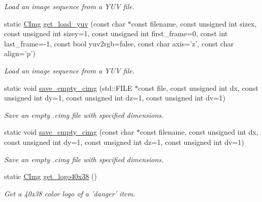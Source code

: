\begin{DoxyCompactItemize}
\begin{DoxyCompactList}\small\item\em Load an image sequence from a Y\-U\-V file. \end{DoxyCompactList}\item 
\hypertarget{structcimg__library_1_1_c_img_a2daa692c3f7bfdcc624d8c43d5416733}{static \hyperlink{structcimg__library_1_1_c_img}{C\-Img} \hyperlink{structcimg__library_1_1_c_img_a2daa692c3f7bfdcc624d8c43d5416733}{get\-\_\-load\-\_\-yuv} (const char $\ast$const filename, const unsigned int sizex, const unsigned int sizey=1, const unsigned int first\-\_\-frame=0, const int last\-\_\-frame=-\/1, const bool yuv2rgb=false, const char axis='z', const char align='p')}\label{structcimg__library_1_1_c_img_a2daa692c3f7bfdcc624d8c43d5416733}

\begin{DoxyCompactList}\small\item\em Load an image sequence from a Y\-U\-V file. \end{DoxyCompactList}\item 
\hypertarget{structcimg__library_1_1_c_img_aaf931adc345724053e6a7e3bb629c4eb}{static void \hyperlink{structcimg__library_1_1_c_img_aaf931adc345724053e6a7e3bb629c4eb}{save\-\_\-empty\-\_\-cimg} (std\-::\-F\-I\-L\-E $\ast$const file, const unsigned int dx, const unsigned int dy=1, const unsigned int dz=1, const unsigned int dv=1)}\label{structcimg__library_1_1_c_img_aaf931adc345724053e6a7e3bb629c4eb}

\begin{DoxyCompactList}\small\item\em Save an empty .cimg file with specified dimensions. \end{DoxyCompactList}\item 
\hypertarget{structcimg__library_1_1_c_img_aed95c69a895eb816a56d769e7f97080b}{static void \hyperlink{structcimg__library_1_1_c_img_aed95c69a895eb816a56d769e7f97080b}{save\-\_\-empty\-\_\-cimg} (const char $\ast$const filename, const unsigned int dx, const unsigned int dy=1, const unsigned int dz=1, const unsigned int dv=1)}\label{structcimg__library_1_1_c_img_aed95c69a895eb816a56d769e7f97080b}

\begin{DoxyCompactList}\small\item\em Save an empty .cimg file with specified dimensions. \end{DoxyCompactList}\item 
\hypertarget{structcimg__library_1_1_c_img_a04d6bb2563befb71032a6ea2c53ec494}{static \hyperlink{structcimg__library_1_1_c_img}{C\-Img} \hyperlink{structcimg__library_1_1_c_img_a04d6bb2563befb71032a6ea2c53ec494}{get\-\_\-logo40x38} ()}\label{structcimg__library_1_1_c_img_a04d6bb2563befb71032a6ea2c53ec494}

\begin{DoxyCompactList}\small\item\em Get a 40x38 color logo of a 'danger' item. \end{DoxyCompactList}\end{DoxyCompactItemize}


